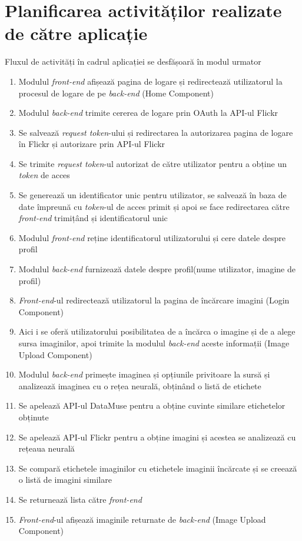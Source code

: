 \section{Planificarea activităților realizate de către aplicație}
Fluxul de activități în cadrul aplicației se desfășoară în modul urmator
\begin{enumerate}
    \item Modulul \textit{front-end} afișează pagina de logare și redirectează utilizatorul la procesul de logare de pe \textit{back-end} (Home Component)
    \item Modulul \textit{back-end} trimite cererea de logare prin OAuth la API-ul Flickr
    \item  Se salvează \textit{request token}-ului și redirectarea la autorizarea pagina de logare în Flickr și autorizare prin API-ul Flickr
    \item Se trimite \textit{request token}-ul autorizat de către utilizator pentru a obține un \textit{token} de acces
    \item  Se generează un identificator unic pentru utilizator, se salvează în baza de date împreună cu \textit{token}-ul de acces primit și apoi se face redirectarea către \textit{front-end} trimițând și identificatorul unic
    \item Modulul \textit{front-end} reține identificatorul utilizatorului și cere  datele despre profil 
    \item Modulul \textit{back-end} furnizează datele despre profil(nume utilizator, imagine de profil)
    \item \textit{Front-end}-ul redirectează utilizatorul la pagina de încărcare imagini (Login Component)
    \item Aici i se oferă utilizatorului posibilitatea de a încărca o imagine și de a alege sursa imaginilor, apoi trimite la modulul \textit{back-end} aceste informații (Image Upload Component)
    \item Modulul \textit{back-end} primește imaginea și opțiunile privitoare la sursă și  analizează imaginea cu o rețea neurală, obținând o listă de etichete
    \item Se apelează API-ul DataMuse pentru a obține cuvinte similare etichetelor obținute
    \item Se apelează API-ul Flickr pentru a obține imagini și acestea se  analizează cu rețeaua neurală
    \item Se compară etichetele imaginilor cu etichetele imaginii încărcate și se creează o listă de imagini similare
    \item Se returnează lista către \textit{front-end}
    \item \textit{Front-end}-ul afișează imaginile returnate de \textit{back-end} (Image Upload Component)
\end{enumerate}{}

